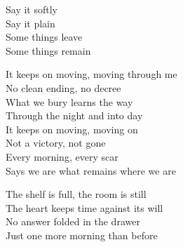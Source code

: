 \begin{lyrics}
Say it softly\\
Say it plain\\
Some things leave\\
Some things remain

It keeps on moving, moving through me\\
No clean ending, no decree\\
What we bury learns the way\\
Through the night and into day\\
It keeps on moving, moving on\\
Not a victory, not gone\\
Every morning, every scar\\
Says we are what remains where we are

The shelf is full, the room is still\\
The heart keeps time against its will\\
No answer folded in the drawer\\
Just one more morning than before
\end{lyrics}

